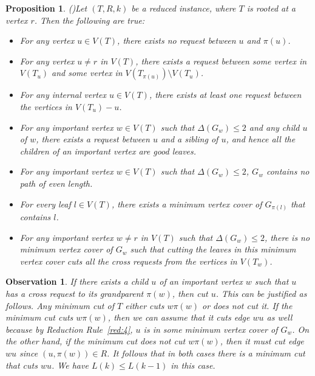 \documentclass[11pt]{article}
\newtheorem{proposition}[theorem]{Proposition}
\newtheorem{observation}[theorem]{Observation}
\begin{document}
\begin{proposition}(\cite{multicut})\label{prop:reduced}
Let $(T, R, k)$ be a reduced instance, where $T$ is rooted at a vertex $r$. Then the following are true:

\begin{itemize}
\item[(i)] For any vertex $u \in V(T)$, there exists no request between $u$ and $\pi(u)$.

\item[(ii)] For any vertex $u \neq r$ in $V(T)$, there exists a request between some vertex in $V(T_u)$ and some vertex in $V(T_{\pi(u)}) \setminus V(T_u)$.

\item[(iii)] For any internal vertex $u \in V(T)$, there exists at least one request between the vertices in $V(T_u) - u$.

\item[(iv)] For any important vertex $w \in V(T)$ such that $\Delta(G_w) \leq 2$ and any child $u$ of $w$, there exists a request between $u$ and a sibling of $u$, and hence all the children of an important vertex are good leaves.

\item[(v)] For any important vertex $w \in V(T)$ such that $\Delta(G_w) \leq 2$, $G_w$ contains no path of even length.

\item[(vi)] For every leaf $l \in V(T)$, there exists a minimum vertex cover of $G_{\pi(l)}$ that contains $l$.

\item[(vii)] For any important vertex $w \neq r$ in $V(T)$ such that $\Delta(G_w) \leq 2$, there is no minimum vertex cover of $G_w$ such that cutting the leaves in this minimum vertex cover cuts all the cross requests from the vertices in $V(T_w)$.
\end{itemize}
\end{proposition}

\begin{observation}\rm
\label{obs:000}
If there exists a child $u$ of an important vertex $w$ such that $u$ has a cross request to its grandparent $\pi(w)$, then cut $u$.
This can be justified as follows. Any minimum cut of $T$ either cuts $w\pi(w)$ or does not cut it. If the minimum cut cuts $w\pi(w)$, then we can assume that it cuts edge $wu$ as well because by Reduction Rule~\ref{red:4}, $u$ is in some minimum vertex cover of $G_w$. On the other hand, if the minimum cut does not cut $w\pi(w)$, then it must cut edge $wu$ since $(u, \pi(w)) \in R$. It follows that in both cases there is a minimum cut that cuts $wu$. We have $L(k) \leq L(k-1)$ in this case.
\end{observation}
\end{document}
